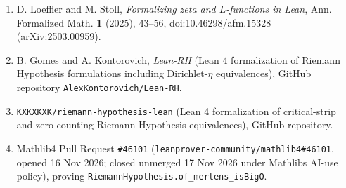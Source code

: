 \documentclass[11pt]{article}
\begin{document}
\begin{enumerate}
\item
  D. Loeffler and M. Stoll, \emph{Formalizing zeta and \(L\)-functions in Lean}, Ann. Formalized Math. \textbf{1} (2025), 43--56, doi:10.46298/afm.15328 (arXiv:2503.00959).
\item
  B. Gomes and A. Kontorovich, \emph{Lean-RH} (Lean 4 formalization of Riemann Hypothesis formulations including Dirichlet-\(\eta\) equivalences), GitHub repository \texttt{AlexKontorovich/Lean-RH}.
\item
  \texttt{KXKXKXK/riemann-hypothesis-lean} (Lean 4 formalization of critical-strip and zero-counting Riemann Hypothesis equivalences), GitHub repository.
\item
  Mathlib4 Pull Request \texttt{\#46101} (\texttt{leanprover-community/mathlib4\#46101}, opened 16 Nov 2026; closed unmerged 17 Nov 2026 under Mathlib\textquotesingle s AI-use policy), proving \texttt{RiemannHypothesis.of\_mertens\_isBigO}.
\end{enumerate}
\end{document}
